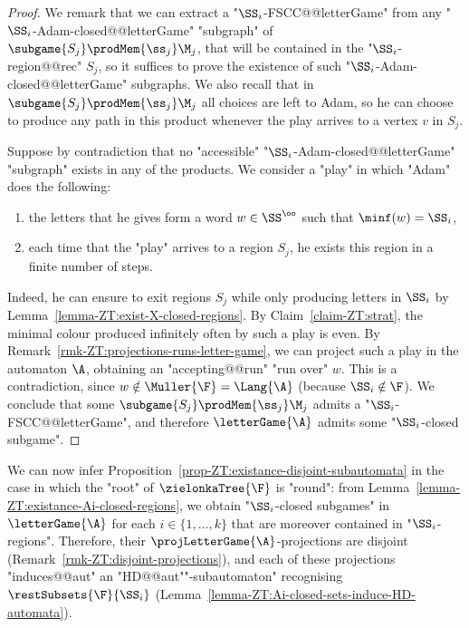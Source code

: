 \documentclass{theoretics}
\begin{document}
\begin{proof}
	We remark that we can extract a "$\SS_i$-FSCC@@letterGame"  from any "$\SS_i$-Adam-closed@@letterGame" "subgraph" of $\subgame{S_j} \prodMem{\ss_j} \M_j$, that will be contained in the "$\SS_i$-region@@rec" $S_j$, so it suffices to prove the existence of such "$\SS_i$-Adam-closed@@letterGame" subgraphs. We also recall that in $\subgame{S_j} \prodMem{\ss_j} \M_j$ all choices are left to Adam, so he can choose to produce any path in this product whenever the play arrives to a vertex $v$ in $S_j$.
	
	Suppose by contradiction that no "accessible" "$\SS_i$-Adam-closed@@letterGame" "subgraph" exists in any of the products. We consider a "play" in which "Adam" does the following:
	\begin{enumerate}[label=(\alph*)]%
		\item the letters that he gives form a word $w\in\SS^\oo$ such that $\minf(w) = \SS_i$, \label{item:letter-inf-often}
		\item each time that the "play" arrives to a region $S_j$, he exists this region in a finite number of steps.\label{item:Adam-exists-regions}
	\end{enumerate}
	Indeed, he can ensure to exit regions $S_j$ while only producing letters in $\SS_i$ by Lemma~\ref{lemma-ZT:exist-X-closed-regions}. By Claim~\ref{claim-ZT:strat}, the minimal colour produced infinitely often by such a play is even.
	By Remark~\ref{rmk-ZT:projections-runs-letter-game}, we can project such a play in the automaton $\A$, obtaining an "accepting@@run" "run over" $w$. This is a contradiction, since $w\notin \Muller{\F} = \Lang{\A}$ (because $\SS_i\notin \F$).
	We conclude that some $\subgame{S_j} \prodMem{\ss_j} \M_j$ admits a "$\SS_i$-FSCC@@letterGame", and therefore  $\letterGame{\A}$ admits some "$\SS_i$-closed subgame".	  
\end{proof}



We can now infer Proposition~\ref{prop-ZT:existance-disjoint-subautomata} in the case in which the "root" of $\zielonkaTree{\F}$ is "round": from Lemma~\ref{lemma-ZT:existance-Ai-closed-regions}, we obtain "$\SS_i$-closed subgames" in $\letterGame{\A}$ for each $i\in\{1,\dots, k\}$ that are moreover contained in "$\SS_i$-regions". Therefore, their $\projLetterGame{\A}$-projections are disjoint (Remark~\ref{rmk-ZT:disjoint-projections}), and each of these projections "induces@@aut" an "HD@@aut""-subautomaton" recognising $\restSubsets{\F}{\SS_i}$ (Lemma~\ref{lemma-ZT:Ai-closed-sets-induce-HD-automata}).
\end{document}
